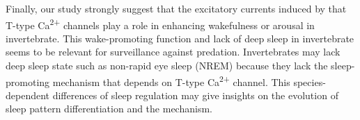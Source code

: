 Finally, our study strongly suggest that the excitatory currents induced by that T-type Ca\textsuperscript{2+} channels play a role in enhancing wakefulness or arousal in invertebrate.
This wake-promoting function and lack of deep sleep in invertebrate seems to be relevant for surveillance against predation.
Invertebrates may lack deep sleep state such as non-rapid eye sleep (NREM) because they lack the sleep-promoting mechanism that depends on T-type Ca\textsuperscript{2+} channel.
This species-dependent differences of sleep regulation may give insights on the evolution of sleep pattern differentiation and the mechanism.